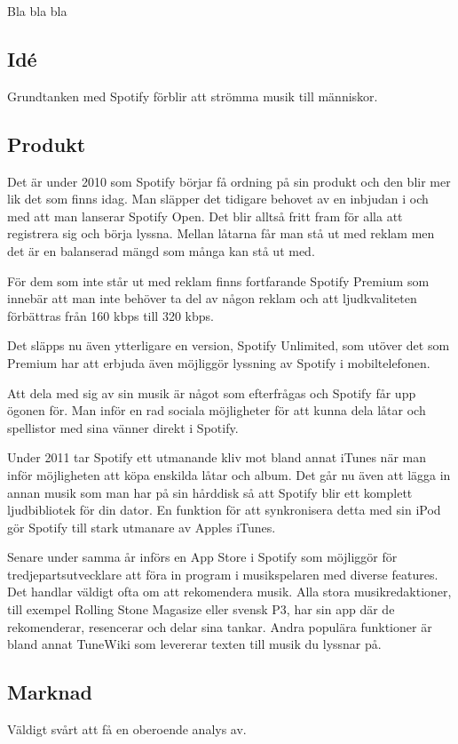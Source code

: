 Bla bla bla

\subsection{Idé}
Grundtanken med Spotify förblir att strömma musik till människor. 

\subsection{Produkt}
Det är under 2010 som Spotify börjar få ordning på sin produkt och den blir mer lik det som finns idag. Man släpper det tidigare behovet av en inbjudan i och med att man lanserar Spotify Open. Det blir alltså fritt fram för alla att registrera sig och börja lyssna. Mellan låtarna får man stå ut med reklam men det är en balanserad mängd som många kan stå ut med. 

För dem som inte står ut med reklam finns fortfarande Spotify Premium som innebär att man inte behöver ta del av någon reklam och att 
ljudkvaliteten förbättras från 160 kbps till 320 kbps. 

Det släpps nu även ytterligare en version, Spotify Unlimited, som utöver det som Premium har att erbjuda även möjliggör lyssning av Spotify i mobiltelefonen.


Att dela med sig av sin musik är något som efterfrågas och Spotify får upp ögonen för. Man inför en rad sociala möjligheter för att kunna dela låtar och spellistor med sina vänner direkt i Spotify. 

Under 2011 tar Spotify ett utmanande kliv mot bland annat iTunes när man inför möjligheten att köpa enskilda låtar och album. Det går nu även att lägga in annan musik som man har på sin hårddisk så att Spotify blir ett komplett ljudbibliotek för din dator. En funktion för att synkronisera detta med sin iPod gör Spotify till stark utmanare av Apples iTunes.

Senare under samma år införs en App Store i Spotify som möjliggör för tredjepartsutvecklare att föra in program i musikspelaren med diverse features. Det handlar väldigt ofta om att rekomendera musik. Alla stora musikredaktioner, till exempel Rolling Stone Magasize eller svensk P3, har sin app där de rekomenderar, resencerar och delar sina tankar. Andra populära funktioner är bland annat TuneWiki som levererar texten till musik du lyssnar på.

\subsection{Marknad}
Väldigt svårt att få en oberoende analys av.

